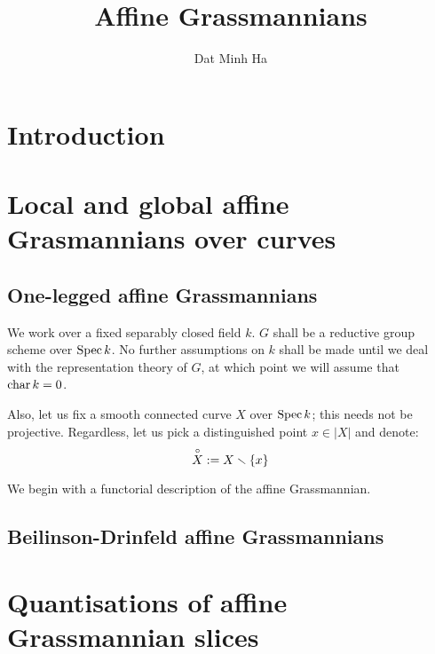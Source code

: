 

\setcounter{section}{-1}





    \title{Affine Grassmannians}
    
    \author{Dat Minh Ha}
    \maketitle
    
    \begin{abstract}
        
    \end{abstract}
    
    {
      \hypersetup{} 
      \tableofcontents %
    }

    \section{Introduction}

    \section{Local and global affine Grasmannians over curves}
        \subsection{One-legged affine Grassmannians}
            \begin{convention}
                We work over a fixed separably closed field $k$. $G$ shall be a reductive group scheme over $\operatorname{Spec} k$. No further assumptions on $k$ shall be made until we deal with the representation theory of $G$, at which point we will assume that $\operatorname{char} k = 0$.
    
                Also, let us fix a smooth connected curve $X$ over $\operatorname{Spec} k$; this needs not be projective. Regardless, let us pick a distinguished point $x \in |X|$ and denote:
                    $$\overset{\circ}{X} := X \smallsetminus \{x\}$$
            \end{convention}
        
            We begin with a functorial description of the affine Grassmannian. 
            \begin{definition} \label{def: affine_grassmannians}
                
            \end{definition}

        \subsection{Beilinson-Drinfeld affine Grassmannians}

    \section{Quantisations of affine Grassmannian slices}
    
    \printbibliography

